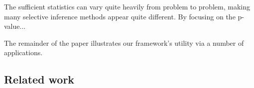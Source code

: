 \documentclass{article}
\begin{document}
The sufficient statistics can vary quite heavily from problem to problem, making many selective inference methods appear quite different. By focusing on the p-value... 

The remainder of the paper illustrates our framework's utility via a number of applications. 





\subsection{Related work}



\end{document}
